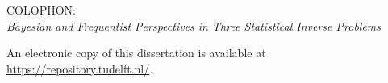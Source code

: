 \begin{titlepage}
    \begin{flushleft}
        COLOPHON: \\
        \textit{Bayesian and Frequentist Perspectives in Three Statistical Inverse Problems}        
    \end{flushleft}
    
    \vfill

    


    \noindent An electronic copy of this dissertation is available at\\
    \url{https://repository.tudelft.nl/}.

\end{titlepage}
